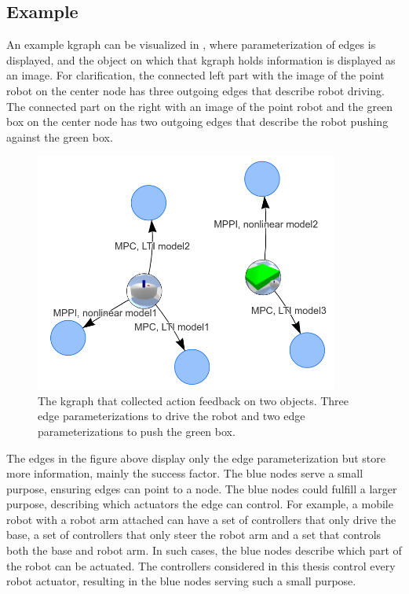 \subsection{Example}%
\label{subsec:kgraph_example}
An example \ac{kgraph} can be visualized in , where parameterization of edges is displayed, and the object on which that \ac{kgraph} holds information is displayed as an image. For clarification, the connected left part with the image of the point robot on the center node has three outgoing edges that describe robot driving. The connected part on the right with an image of the point robot and the green box on the center node has two outgoing edges that describe the robot pushing against the green box.\bs

\begin{figure}[H]
    \centering
    \includegraphics[width=10cm]{figures/proposed_method/kgraph_example}
    \caption{The \ac{kgraph} that collected action feedback on two objects. Three edge parameterizations to drive the robot and two edge parameterizations to push the green box.}%
    \label{fig:kgraph_example}
\end{figure}


The edges in the figure above display only the edge parameterization but store more information, mainly the success factor. The blue nodes serve a small purpose, ensuring edges can point to a node. The blue nodes could fulfill a larger purpose, describing which actuators the edge can control. For example, a mobile robot with a robot arm attached can have a set of controllers that only drive the base, a set of controllers that only steer the robot arm and a set that controls both the base and robot arm. In such cases, the blue nodes describe which part of the robot can be actuated. The controllers considered in this thesis control every robot actuator, resulting in the blue nodes serving such a small purpose.\bs
